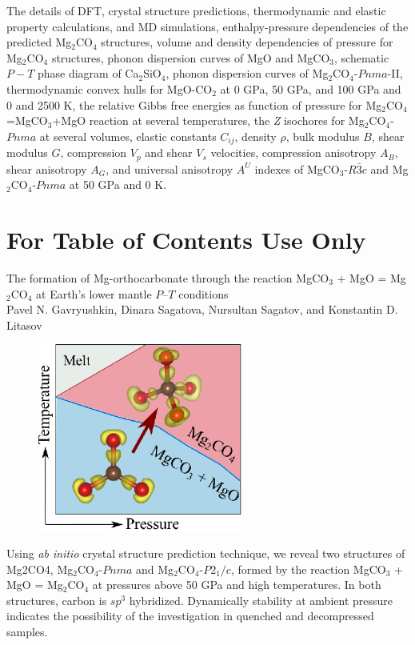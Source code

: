 \documentclass[a4paperm]{article}
\begin{document}
The details of DFT, crystal structure predictions, thermodynamic and elastic property calculations, and MD simulations, enthalpy-pressure dependencies of the predicted Mg$_2$CO$_4$ structures, volume and density dependencies of pressure for Mg$_2$CO$_4$ structures, phonon dispersion curves of MgO and MgCO$_3$, schematic $P-T$ phase diagram of Ca$_2$SiO$_4$, phonon dispersion curves of Mg$_2$CO$_4$-$Pnma$-II, thermodynamic convex hulls for MgO-CO$_2$ at 0 GPa, 50 GPa, and 100 GPa and 0 and 2500 K, the relative Gibbs free energies as function of pressure for Mg$_2$CO$_4$=MgCO$_3$+MgO reaction at several temperatures, the {\it Z} isochores for Mg$_2$CO$_4$-$Pnma$ at several volumes, elastic constants $C_{ij}$, density $\rho$, bulk modulus $B$, shear modulus $G$, compression $V_p$ and shear $V_s$ velocities, compression anisotropy $A_B$, shear anisotropy $A_G$, and universal anisotropy $A^U$ indexes of MgCO$_3$-$R\bar{3}c$ and Mg$_2$CO$_4$-$Pnma$ at 50 GPa and 0 K. 




\newpage
\section*{For Table of Contents Use Only}

The formation of Mg-orthocarbonate through the reaction MgCO$_3$ + MgO = Mg$_2$CO$_4$ at Earth's lower mantle $P$--$T$ conditions
\vspace{5mm} \\
Pavel N. Gavryushkin, Dinara Sagatova, Nursultan Sagatov, and Konstantin D. Litasov
\vspace{5mm} \\

\begin{figure}[H]
\includegraphics[width=0.6\textwidth]{toc_mg2co4} \centering

\end{figure}

Using {\it ab initio} crystal structure prediction technique, we reveal two structures of Mg2CO4,  Mg$_2$CO$_4$-$Pnma$ and  Mg$_2$CO$_4$-$P2_1/c$, formed by the reaction MgCO$_3$ + MgO = Mg$_2$CO$_4$ at pressures above 50 GPa and high temperatures.
In both structures, carbon is $sp^3$ hybridized.
Dynamically stability at ambient pressure indicates the possibility of the investigation in quenched and decompressed samples. 
\end{document}
